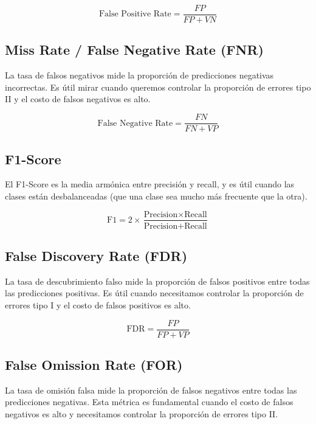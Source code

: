 \documentclass[12pt]{article}
\begin{document}
\vspace{0.3em}

\[
\text{False Positive Rate} = \frac{FP}{FP + VN}
\]

\vspace{0.3em}

\subsection{Miss Rate / False Negative Rate (FNR)}
La tasa de falsos negativos mide la proporción de predicciones negativas incorrectas. Es útil mirar cuando queremos controlar la proporción de errores tipo II y el costo de falsos negativos es alto.

\vspace{0.3em}

\[
\text{False Negative Rate} = \frac{FN}{FN + VP}
\]

\vspace{0.3em}


\subsection{F1-Score}
El F1-Score es la media armónica entre precisión y recall, y es útil cuando las clases están desbalanceadas (que una clase sea mucho más frecuente que la otra).

\vspace{0.3em}

\[
\text{F1} = 2 \times \frac{\text{Precision} \times \text{Recall}}{\text{Precision} + \text{Recall}}
\]

\vspace{0.3em}

\subsection{False Discovery Rate (FDR)}
La tasa de descubrimiento falso mide la proporción de falsos positivos entre todas las predicciones positivas. Es útil cuando necesitamos controlar la proporción de errores tipo I y el costo de falsos positivos es alto.

\vspace{0.3em}

\[
\text{FDR} = \frac{FP}{FP + VP}
\]

\vspace{0.3em}

\subsection{False Omission Rate (FOR)}
La tasa de omisión falsa mide la proporción de falsos negativos entre todas las predicciones negativas. Esta métrica es fundamental cuando el costo de falsos negativos es alto y necesitamos controlar la proporción de errores tipo II.
\end{document}
